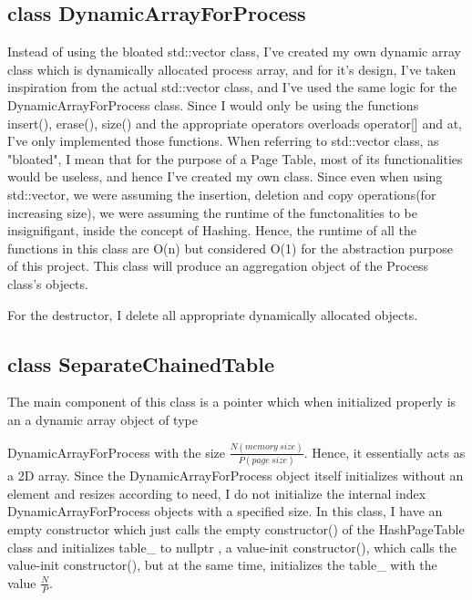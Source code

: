 \subsection{{\color{orange}class} {\color{draculapurple}DynamicArrayForProcess}}
    Instead of using the bloated {\color{draculapurple}std::vector} class, I've created my own dynamic array class
    which is dynamically allocated process array, and for it's design, I've taken inspiration from the actual
    {\color{draculapurple}std::vector} class, and I've used the same logic for the {\color{draculapurple}DynamicArrayForProcess} class.
    Since I would only be using the functions {\color{draculapurple}insert()}, {\color{draculapurple}erase()},
    {\color{draculapurple}size()} and the appropriate operators overloads {\color{draculapurple}operator[]} and {\color{draculapurple}at},
    I've only implemented those functions. When referring to {\color{draculapurple}std::vector} class, as "bloated", I mean that
    for the purpose of a Page Table, most of its functionalities would be useless, and hence I've created my own class.
    Since even when using {\color{draculapurple}std::vector}, we were assuming the insertion, deletion and copy
    operations(for increasing size), we were assuming the runtime of the functonalities to be insignifigant, inside the concept of Hashing.
    Hence, the runtime of all the functions in this class are {\color{lightblue}O(n)} but considered {\color{lightblue}O(1)} for the
    abstraction purpose of this project. This class will produce an aggregation object of the {\color{draculapurple}Process} class's objects.

    For the destructor, I delete all appropriate dynamically allocated objects.


\subsection{{\color{orange}class} {\color{draculapurple}SeparateChainedTable}}

        The main component of this class is a pointer which when initialized properly is an a dynamic array object of type

        {\color{draculapurple}DynamicArrayForProcess} with the size {\color{lightblue}$\frac{N(memory\ size)}{P(page\ size)}$}. Hence, it essentially acts as a 2D array.
        Since the {\color{draculapurple}DynamicArrayForProcess} object itself initializes without an element and resizes
        according to need, I do not initialize the internal index {\color{draculapurple}DynamicArrayForProcess} objects with a specified size.
        In this class, I have an empty constructor which just calls the empty {\color{draculapurple}constructor()} of the {\color{draculapurple}HashPageTable} class and
        initializes {\color{Turquoise}table\_} to {\color{LightPink}nullptr} , a value-init {\color{draculapurple}constructor()},
        which calls the value-init {\color{draculapurple}constructor()}, but at the same time, initializes the {\color{Turquoise}table\_} with the value
        {\color{lightblue}$\frac{N}{P}$}. 

